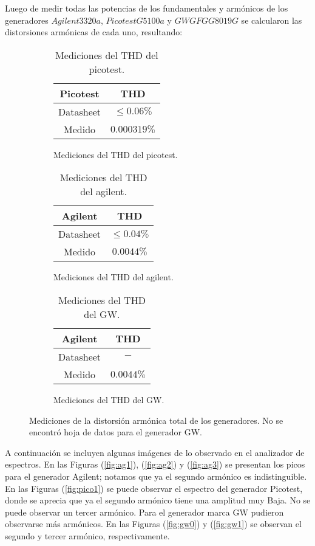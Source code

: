 Luego de medir todas las potencias de los fundamentales y armónicos de los generadores $Agilent 3320a$, $Picotest G5100a$ y $GWGFG G8019G$ se calcularon las distorsiones armónicas de cada uno, resultando:

\begin{figure}[H]
\begin{subfigure}{0.33\textwidth}
\begin{table}[H]
\centering
\begin{tabular}{@{}cc@{}}
\toprule
Picotest & THD\\ \midrule
Datasheet & $\leq 0.06\%$  \\
Medido & $0.000319\%$ \\ \bottomrule
\end{tabular}
\caption{Mediciones del THD del picotest.}
\end{table}
\end{subfigure}
\begin{subfigure}{0.33\textwidth}
\begin{table}[H]
\centering
\begin{tabular}{@{}cc@{}}
\toprule
Agilent & THD \\ \midrule
Datasheet & $\leq 0.04\%$ \\
Medido & $0.0044\%$ \\ \bottomrule
\end{tabular}
\caption{Mediciones del THD del agilent.}
\end{table}
\end{subfigure}
\begin{subfigure}{0.33\textwidth}
\begin{table}[H]
\centering
\begin{tabular}{@{}cc@{}}
\toprule
Agilent & THD \\ \midrule
Datasheet & $-$ \\
Medido & $0.0044\%$ \\ \bottomrule
\end{tabular}
\caption{Mediciones del THD del GW.}
\end{table}
\end{subfigure}
\caption{Mediciones de la distorsión armónica total de los generadores. No se encontró hoja de datos para el generador GW.}
\end{figure}

A continuación se incluyen algunas imágenes de lo observado en el analizador de espectros. En las Figuras (\ref{fig:ag1}), (\ref{fig:ag2}) y (\ref{fig:ag3}) se presentan los picos para el generador Agilent; notamos que ya el segundo armónico es indistinguible. En las Figuras (\ref{fig:pico1}) se puede observar el espectro del generador Picotest, donde se aprecia que ya el segundo armónico tiene una amplitud muy Baja. No se puede observar un tercer armónico. Para el generador marca GW pudieron observarse más armónicos. En las Figuras (\ref{fig:gw0}) y (\ref{fig:gw1}) se observan el segundo y tercer armónico, respectivamente.

